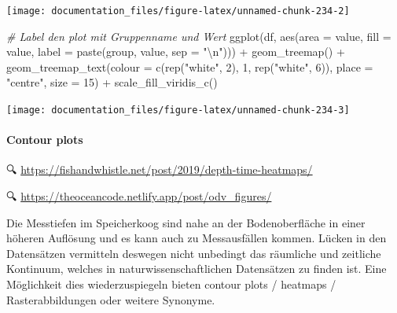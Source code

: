 \documentclass[
]{article}
\newenvironment{Shaded}{\begin{snugshade}}{\end{snugshade}}
\newcommand{\AttributeTok}[1]{\textcolor[rgb]{0.77,0.63,0.00}{#1}}
\newcommand{\CommentTok}[1]{\textcolor[rgb]{0.56,0.35,0.01}{\textit{#1}}}
\newcommand{\DecValTok}[1]{\textcolor[rgb]{0.00,0.00,0.81}{#1}}
\newcommand{\FunctionTok}[1]{\textcolor[rgb]{0.00,0.00,0.00}{#1}}
\newcommand{\NormalTok}[1]{#1}
\newcommand{\SpecialCharTok}[1]{\textcolor[rgb]{0.00,0.00,0.00}{#1}}
\newcommand{\StringTok}[1]{\textcolor[rgb]{0.31,0.60,0.02}{#1}}
\begin{document}
\begin{center}\texttt{[image: documentation\_files/figure-latex/unnamed-chunk-234-2]} \end{center}

\begin{Shaded}
\begin{Highlighting}[]
 
\CommentTok{\# Label den plot mit Gruppenname und Wert}
\FunctionTok{ggplot}\NormalTok{(df, }\FunctionTok{aes}\NormalTok{(}\AttributeTok{area =}\NormalTok{ value, }\AttributeTok{fill =}\NormalTok{ value, }\AttributeTok{label =} \FunctionTok{paste}\NormalTok{(group, value, }\AttributeTok{sep =} \StringTok{"}\SpecialCharTok{\textbackslash{}n}\StringTok{"}\NormalTok{))) }\SpecialCharTok{+}
  \FunctionTok{geom\_treemap}\NormalTok{() }\SpecialCharTok{+}
  \FunctionTok{geom\_treemap\_text}\NormalTok{(}\AttributeTok{colour =} \FunctionTok{c}\NormalTok{(}\FunctionTok{rep}\NormalTok{(}\StringTok{"white"}\NormalTok{, }\DecValTok{2}\NormalTok{),}
                               \DecValTok{1}\NormalTok{, }\FunctionTok{rep}\NormalTok{(}\StringTok{"white"}\NormalTok{, }\DecValTok{6}\NormalTok{)),}
                    \AttributeTok{place =} \StringTok{"centre"}\NormalTok{, }\AttributeTok{size =} \DecValTok{15}\NormalTok{) }\SpecialCharTok{+}
  \FunctionTok{scale\_fill\_viridis\_c}\NormalTok{()}
\end{Highlighting}
\end{Shaded}

\begin{center}\texttt{[image: documentation\_files/figure-latex/unnamed-chunk-234-3]} \end{center}

\hypertarget{contour-plots}{%
\paragraph{Contour plots}\label{contour-plots}}

🔍 \url{https://fishandwhistle.net/post/2019/depth-time-heatmaps/}

🔍 \url{https://theoceancode.netlify.app/post/odv_figures/}

Die Messtiefen im Speicherkoog sind nahe an der Bodenoberfläche in einer höheren Auflösung und es kann auch zu Messausfällen kommen. Lücken in den Datensätzen vermitteln deswegen nicht unbedingt das räumliche und zeitliche Kontinuum, welches in naturwissenschaftlichen Datensätzen zu finden ist. Eine Möglichkeit dies wiederzuspiegeln bieten contour plots / heatmaps / Rasterabbildungen oder weitere Synonyme.
\end{document}
